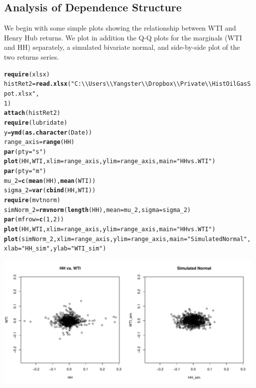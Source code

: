 \documentclass[10pt]{article}\usepackage[]{graphicx}\usepackage[]{color}
\makeatletter
\def\maxwidth{ %
  \ifdim\Gin@nat@width>\linewidth
    \linewidth
  \else
    \Gin@nat@width
  \fi
}
\newcommand{\hlnum}[1]{\textcolor[rgb]{0.686,0.059,0.569}{#1}}%
\newcommand{\hlstr}[1]{\textcolor[rgb]{0.192,0.494,0.8}{#1}}%
\newcommand{\hlstd}[1]{\textcolor[rgb]{0.345,0.345,0.345}{#1}}%
\newcommand{\hlkwb}[1]{\textcolor[rgb]{0.69,0.353,0.396}{#1}}%
\newcommand{\hlkwc}[1]{\textcolor[rgb]{0.333,0.667,0.333}{#1}}%
\newcommand{\hlkwd}[1]{\textcolor[rgb]{0.737,0.353,0.396}{\textbf{#1}}}%
\newenvironment{kframe}{%
 \def\at@end@of@kframe{}%
 \ifinner\ifhmode%
  \def\at@end@of@kframe{\end{minipage}}%
  \begin{minipage}{\columnwidth}%
 \fi\fi%
 \def\FrameCommand##1{\hskip\@totalleftmargin \hskip-\fboxsep
 \colorbox{shadecolor}{##1}\hskip-\fboxsep
     \hskip-\linewidth \hskip-\@totalleftmargin \hskip\columnwidth}%
 \MakeFramed {\advance\hsize-\width
   \@totalleftmargin\z@ \linewidth\hsize
   \@setminipage}}%
 {\par\unskip\endMakeFramed%
 \at@end@of@kframe}
\newenvironment{knitrout}{}{} %
\makeatother
\begin{document}
\subsection{Analysis of Dependence Structure}  
We begin with some simple plots showing the relationship between WTI and Henry Hub returns. We plot in addition the Q-Q plots for the marginals (WTI and HH) separately, a simulated bivariate normal, and side-by-side plot of the two returns series.
\begin{knitrout}
\color{fgcolor}\begin{kframe}
\begin{alltt}
\hlkwd{require}\hlstd{(xlsx)}
\hlstd{histRet2} \hlkwb{=} \hlkwd{read.xlsx}\hlstd{(}\hlstr{"C:\textbackslash{}\textbackslash{}Users\textbackslash{}\textbackslash{}Yangster\textbackslash{}\textbackslash{}Dropbox\textbackslash{}\textbackslash{}Private\textbackslash{}\textbackslash{}HistOilGasSpot.xlsx"}\hlstd{,}
    \hlnum{1}\hlstd{)}
\hlkwd{attach}\hlstd{(histRet2)}
\hlkwd{require}\hlstd{(lubridate)}
\hlstd{y} \hlkwb{=} \hlkwd{ymd}\hlstd{(}\hlkwd{as.character}\hlstd{(Date))}
\hlstd{range_axis} \hlkwb{=} \hlkwd{range}\hlstd{(HH)}
\hlkwd{par}\hlstd{(}\hlkwc{pty} \hlstd{=} \hlstr{"s"}\hlstd{)}
\hlkwd{plot}\hlstd{(HH, WTI,} \hlkwc{xlim} \hlstd{= range_axis,} \hlkwc{ylim} \hlstd{= range_axis,} \hlkwc{main} \hlstd{=} \hlstr{"HH vs. WTI"}\hlstd{)}
\hlkwd{par}\hlstd{(}\hlkwc{pty} \hlstd{=} \hlstr{"m"}\hlstd{)}
\hlstd{mu_2} \hlkwb{=} \hlkwd{c}\hlstd{(}\hlkwd{mean}\hlstd{(HH),} \hlkwd{mean}\hlstd{(WTI))}
\hlstd{sigma_2} \hlkwb{=} \hlkwd{var}\hlstd{(}\hlkwd{cbind}\hlstd{(HH, WTI))}
\hlkwd{require}\hlstd{(mvtnorm)}
\hlstd{simNorm_2} \hlkwb{=} \hlkwd{rmvnorm}\hlstd{(}\hlkwd{length}\hlstd{(HH),} \hlkwc{mean} \hlstd{= mu_2,} \hlkwc{sigma} \hlstd{= sigma_2)}
\hlkwd{par}\hlstd{(}\hlkwc{mfrow} \hlstd{=} \hlkwd{c}\hlstd{(}\hlnum{1}\hlstd{,} \hlnum{2}\hlstd{))}
\hlkwd{plot}\hlstd{(HH, WTI,} \hlkwc{xlim} \hlstd{= range_axis,} \hlkwc{ylim} \hlstd{= range_axis,} \hlkwc{main} \hlstd{=} \hlstr{"HH vs. WTI"}\hlstd{)}
\hlkwd{plot}\hlstd{(simNorm_2,} \hlkwc{xlim} \hlstd{= range_axis,} \hlkwc{ylim} \hlstd{= range_axis,} \hlkwc{main} \hlstd{=} \hlstr{"Simulated Normal"}\hlstd{,}
    \hlkwc{xlab} \hlstd{=} \hlstr{"HH_sim"}\hlstd{,} \hlkwc{ylab} \hlstd{=} \hlstr{"WTI_sim"}\hlstd{)}
\end{alltt}
\end{kframe}

{\centering \includegraphics[width=\maxwidth]{figure/unnamed-chunk-111} 

}
\end{knitrout}
\end{document}
